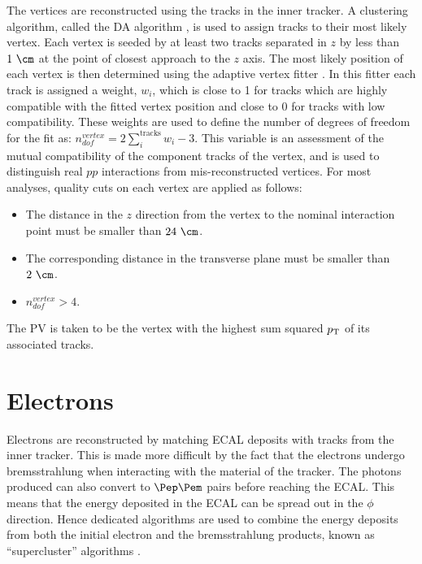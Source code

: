 The vertices are reconstructed using the tracks in the inner
tracker. A clustering algorithm, called the \ac{DA} algorithm
\cite{DetAnnealing}, is used to assign tracks to their most likely 
vertex. Each vertex is seeded by at least two tracks separated in $z$ by less than
$1~\cm$ at the point of closest approach to the $z$ axis.
The most likely position of each vertex is then determined using the
adaptive vertex fitter \cite{adaptivevertex}. In
this fitter each track is assigned a weight, $w_{i}$, which is close to 1 for tracks which
are highly compatible with the fitted vertex position and close to 0 for tracks with low
compatibility. These weights are used to define the number of degrees of freedom
for the fit as: $n_{dof}^{vertex} = 2\sum_{i}^{\text{tracks}}w_{i}-3$. This
variable is an assessment of the mutual compatibility of the component tracks of
the vertex, and is used to distinguish real $pp$ interactions from
mis-reconstructed vertices. For most analyses, quality cuts \cite{CMS-PAS-TRK-10-005} on each vertex are
applied as follows:
\begin{itemize}
\item The distance in the $z$ direction from the vertex to the nominal interaction
point must be smaller than $24~\cm$. 
\item The corresponding distance in the transverse plane must be smaller than
$2~\cm$.
\item $n_{dof}^{vertex} > 4$.
\end{itemize}

The \ac{PV} is taken to be the vertex with the highest sum squared $p_{\mathrm{T}}$ of its
associated tracks. 

\section{Electrons}
\label{sec:electrons}

Electrons are reconstructed by matching \ac{ECAL} deposits with tracks from the
inner tracker. This is made more difficult by the fact that the electrons
undergo bremsstrahlung when interacting with the material of the tracker.
The photons produced can also convert to $\Pep\Pem$ pairs before
reaching the \ac{ECAL}. This means that the energy deposited in the \ac{ECAL} 
can be spread out in the $\phi$ direction. Hence dedicated algorithms are used
to combine the energy deposits from both the initial electron and the
bremsstrahlung products, known as ``supercluster'' algorithms \cite{ElectronReco}.

